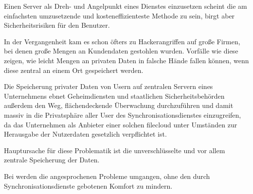 Einen Server als Dreh- und Angelpunkt eines Dienstes einzusetzen scheint die am
einfachsten umzusetzende und kosteneffizienteste Methode zu sein, birgt aber Sicherheitsrisiken
für den Benutzer.

In der Vergangenheit kam es schon öfters zu Hackerangriffen auf große Firmen, bei
denen große Mengen an Kundendaten gestohlen wurden. Vorfälle wie diese zeigen, wie leicht
Mengen an privaten Daten in falsche Hände fallen können, wenn diese zentral an einem Ort
gespeichert werden.

Die Speicherung privater Daten von Usern auf zentralen Servern eines Unternehmens ebnet
Geheimdiensten und staatlichen Sicherheitsbehörden außerdem den Weg, flächendeckende Überwachung
durchzuführen und damit massiv in die Privatsphäre aller User des Synchronisationsdienstes
einzugreifen, da das Unternehmen als Anbieter einer solchen \gls{filecloud} unter Umständen zur
Herausgabe der Nutzerdaten gesetzlich verpflichtet ist.

Hauptursache für diese Problematik ist die unverschlüsselte und vor allem zentrale
Speicherung der Daten.

Bei \sblit werden die angesprochenen Probleme umgangen, ohne den durch Synchronisationsdienste
gebotenen Komfort zu mindern.
